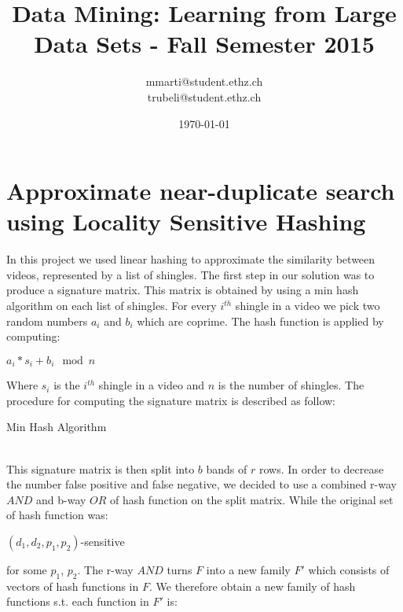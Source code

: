 \documentclass[a4paper, 11pt]{article}
\title{Data Mining: Learning from Large Data Sets - Fall Semester 2015}
\author{mmarti@student.ethz.ch\\ trubeli@student.ethz.ch\\}
\date{\today}
\begin{document}
\maketitle

\section*{Approximate near-duplicate search using Locality Sensitive Hashing} 
In this project we used linear hashing to approximate the similarity between videos, represented by a list of shingles. The first step in our solution was to produce a signature matrix. This matrix is obtained by using a min hash algorithm on each list of shingles. For every $i^{th}$ shingle in a video we pick two random numbers $a_{i}$ and $b_{i}$ which are coprime. 
The hash function is applied by computing:
\begin{center}
	$a_{i}*s_{i} + b_{i} \mod{n}$
\end{center}
Where $s_{i}$ is the $i^{th}$ shingle in a video and $n$ is the number of shingles.
The procedure for computing the signature matrix is described as follow:
\vspace{8pt}
\begin{algorithm}
	\caption{Min Hash Algorithm}\label{euclid}
	\begin{algorithmic}[1]
			\EndIf
			\EndFor
		\EndFor
	
		\EndProcedure
	\end{algorithmic}
\end{algorithm}
\\This signature matrix is then split into $b$ bands of $r$ rows. In order to decrease the number false positive and false negative, we decided to use a combined r-way $AND$ and b-way $OR$ of hash function on the split matrix. While the original set of hash function was:
\vspace{8pt}
\begin{center}
	$(d_{1},d_{2},p_{1},p_{2})$-sensitive
\end{center}
\vspace{8pt}
for some $p_{1}$, $p_{2}$. The r-way $AND$ turns $F$ into a new family $F'$ which consists of vectors of hash functions in $F$. We therefore obtain a new family of hash functions s.t. each function in $F'$ is:
\end{document}
